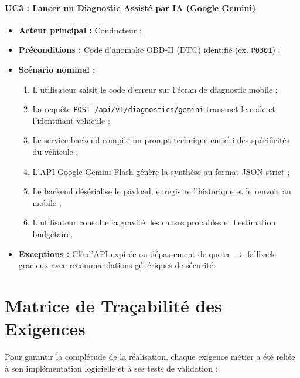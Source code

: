 \documentclass[12pt,a4paper,oneside]{report}
\newcommand{\bpuce}{\textcolor{midBlue}{$\blacktriangleright$}\;}
\begin{document}
\paragraph{UC3 : Lancer un Diagnostic Assist\'e par IA (Google Gemini)}
\begin{itemize}[label=\bpuce]
  \item \textbf{Acteur principal :} Conducteur ;
  \item \textbf{Pr\'econditions :} Code d'anomalie OBD-II (DTC) identifi\'e (ex. \texttt{P0301}) ;
  \item \textbf{Sc\'enario nominal :}
    \begin{enumerate}
      \item L'utilisateur saisit le code d'erreur sur l'\'ecran de diagnostic mobile ;
      \item La requ\^ete \texttt{POST /api/v1/diagnostics/gemini} transmet le code et l'identifiant v\'ehicule ;
      \item Le service backend compile un prompt technique enrichi des sp\'ecificit\'es du v\'ehicule ;
      \item L'API Google Gemini Flash g\'en\`ere la synth\`ese au format JSON strict ;
      \item Le backend d\'es\'erialise le payload, enregistre l'historique et le renvoie au mobile ;
      \item L'utilisateur consulte la gravit\'e, les causes probables et l'estimation budg\'etaire.
    \end{enumerate}
  \item \textbf{Exceptions :} Cl\'e d'API expir\'ee ou d\'epassement de quota $\rightarrow$ fallback gracieux avec recommandations g\'en\'eriques de s\'ecurit\'e.
\end{itemize}

\section{Matrice de Tra\c{c}abilit\'e des Exigences}
Pour garantir la compl\'etude de la r\'ealisation, chaque exigence m\'etier a \'et\'e reli\'ee \`a son impl\'ementation logicielle et \`a ses tests de validation :
\end{document}
